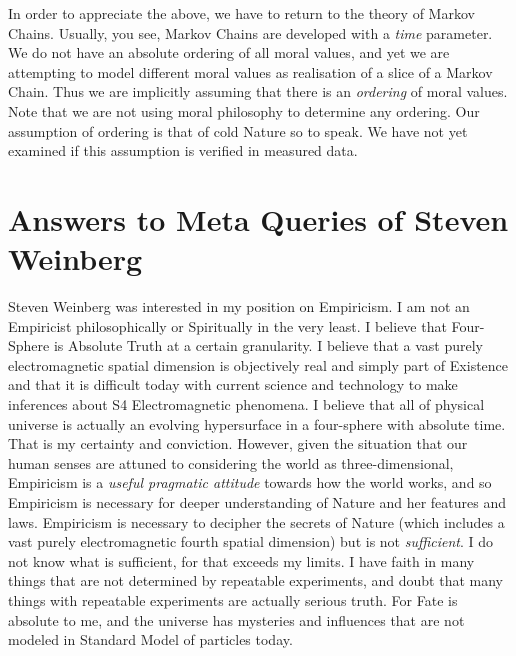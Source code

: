 \documentclass{amsart}
\begin{document}
In order to appreciate the above, we have to return to the theory of Markov Chains.  Usually, you see, Markov Chains are developed with a {\em time} parameter.  We do not have an absolute ordering of all moral values, and yet we are attempting to model different moral values as realisation of a slice of a Markov Chain. Thus we are implicitly assuming that there is an {\em ordering} of moral values.  Note that we are not using moral philosophy to determine any ordering.  Our assumption of ordering is that of cold Nature so to speak.  We have not yet examined if this assumption is verified in measured data.

\section{Answers to Meta Queries of Steven Weinberg}

Steven Weinberg was interested in my position on Empiricism.  I am not an Empiricist philosophically or Spiritually in the very least.  I believe that Four-Sphere is Absolute Truth at a certain granularity.  I believe that a vast purely electromagnetic spatial dimension is objectively real and simply part of Existence and that it is difficult today with current science and technology to make inferences about S4 Electromagnetic phenomena.  I believe that all of physical universe is actually an evolving hypersurface in a four-sphere with absolute time.  That is my certainty and conviction.  However, given the situation that our human senses are attuned to considering the world as three-dimensional, Empiricism is a {\em useful pragmatic attitude} towards how the world works, and so Empiricism is necessary for deeper understanding of Nature and her features and laws.  Empiricism is necessary to decipher the secrets of Nature (which includes a vast purely electromagnetic fourth spatial dimension) but is not {\em sufficient}.  I do not know what is sufficient, for that exceeds my limits.  I have faith in many things that are not determined by repeatable experiments, and doubt that many things with repeatable experiments are actually serious truth.  For Fate is absolute to me, and the universe has mysteries and influences that are not modeled in Standard Model of particles today.
\end{document}

